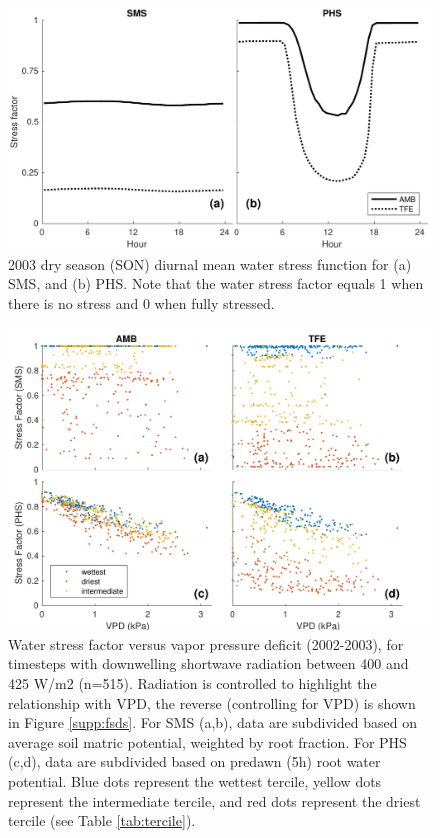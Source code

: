 \documentclass[draft,linenumbers]{agujournal}
\begin{document}
  
    \clearpage
    \begin{figure}[h]
     \centering
     \includegraphics[width=30pc]{../figs3/fig4.pdf}
     \caption{2003 dry season (SON) diurnal mean water stress function for 
     (a) SMS, and
     (b) PHS.
     Note that the water stress factor equals 1 when there is no stress and 0 when fully stressed.
     }
     \label{fig:stress1}
  \end{figure}
  
      \clearpage
    \begin{figure}[h]
     \centering
     \includegraphics[width=30pc]{../figs3/vpdstress.pdf}
     \caption{Water stress factor versus vapor pressure deficit (2002-2003), for timesteps with downwelling shortwave radiation between 400 and 425 W/m2 (n=515).
     Radiation is controlled to highlight the relationship with VPD, the reverse (controlling for VPD) is shown in Figure \ref{supp:fsds}.
     For SMS (a,b), data are subdivided based on average soil matric potential, weighted by root fraction.
     For PHS (c,d), data are subdivided based on predawn (5h) root water potential.
     Blue dots represent the wettest tercile, yellow dots represent the intermediate tercile, and red dots represent the driest tercile (see Table \ref{tab:tercile}).
     }
     \label{fig:stress2}
       \end{figure}
      
\end{document}
